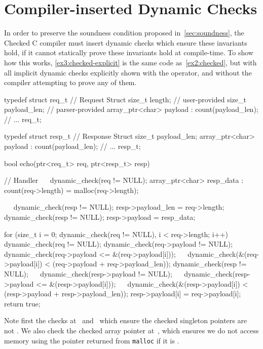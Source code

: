 \section{Compiler-inserted Dynamic Checks}

In order to preserve the soundness condition proposed
in~\autoref{sec:soundness}, the Checked C compiler must insert dynamic
checks which ensure these invariants hold, if it cannot statically
prove these invariants hold at compile-time. To show how this works,
\autoref{ex3:checked-explicit} is the same code
as~\autoref{ex2:checked}, but with all implicit dynamic checks
explicitly shown with the \kwdynamiccheck{} operator, and without the
compiler attempting to prove any of them.

\begin{code}[label=ex3:checked-explicit,float=t,caption={Checked Example with Explicit Checks (Based on \autoref{ex2:checked})}]
typedef struct req_t {  // Request Struct
  size_t length;         // user-provided
  size_t payload_len;    // parser-provided
  array_ptr<char> payload : count(payload_len);
  // ...
} req_t;

typedef struct resp_t {  // Response Struct
  size_t payload_len;
  array_ptr<char> payload : count(payload_len);
  // ...
} resp_t;

bool echo(ptr<req_t> req, ptr<resp_t> resp) {  // Handler
~~  dynamic_check(req != NULL);
  array_ptr<char> resp_data : count(req->length) = malloc(req->length);

~~  dynamic_check(resp != NULL);
  resp->payload_len = req->length;
  dynamic_check(resp != NULL);
  resp->payload     = resp_data;

  for (size_t i = 0; dynamic_check(req != NULL), i < req->length; i++) {
    dynamic_check(req != NULL);
    dynamic_check(req->payload != NULL);
~~    dynamic_check(req->payload <= &(req->payload[i]));
~~    dynamic_check(&(req->payload[i]) < (req->payload + req->payload_len));
    dynamic_check(resp != NULL);
~~    dynamic_check(resp->payload != NULL);
~~    dynamic_check(resp->payload <= &(resp->payload[i]));
~~    dynamic_check(&(resp->payload[i]) < (resp->payload + resp->payload_len));
    resp->payload[i] = req->payload[i];
  }
  return true;
}
\end{code}

Note first the checks at~ and~
which ensure the checked singleton pointers are not \NULL. We also
check the checked array pointer at~, which
ensures we do not access memory using the pointer returned from
\lstinline|malloc| if it is \NULL.

